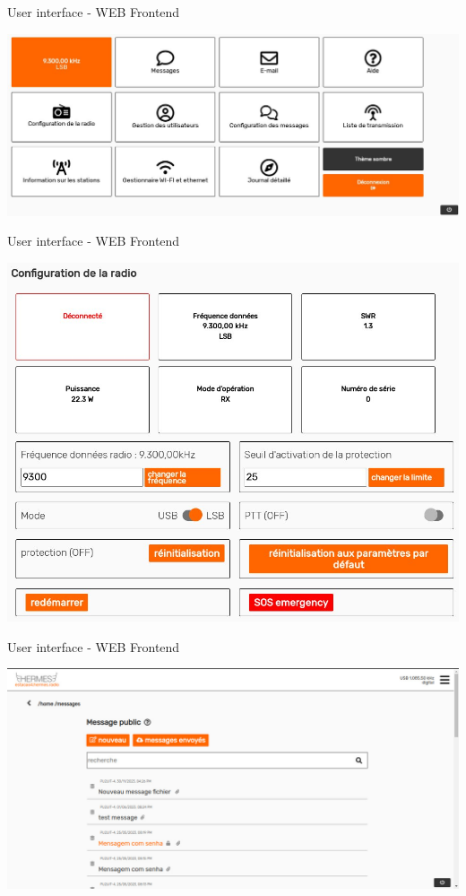 \documentclass[aspectratio=169,xcolor={x11names,svgnames,dvipsnames}]{beamer}
\begin{document}
\begin{frame}{User interface - WEB Frontend}

  \vspace{-0.15cm}
  \begin{center}
    \includegraphics[width=.9\columnwidth]{hermes-ui2.jpg}


  \end{center}


\end{frame}

\begin{frame}{User interface - WEB Frontend}

  \vspace{-0.15cm}
  \begin{center}
    \includegraphics[width=.6\columnwidth]{hermes-ui3.jpg}
  \end{center}


\end{frame}


\begin{frame}{User interface - WEB Frontend}

  \vspace{-0.15cm}
  \begin{center}
    \includegraphics[width=.9\columnwidth]{hermes-ui5.jpg}
  \end{center}


\end{frame}
\end{document}
